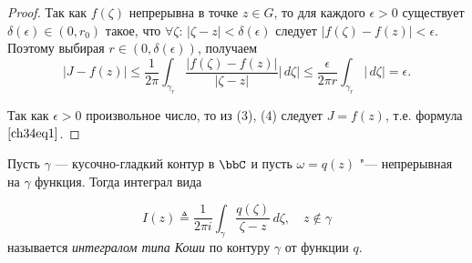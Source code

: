 \begin{proof}
Так как $f(\zeta)$ непрерывна в точке $z \in G$, то для каждого $\epsilon > 0$ существует $\delta(\epsilon) \in (0, r_0)$ такое, что $\forall \zeta$: $|\zeta - z| < \delta(\epsilon)$ следует $|f(\zeta) - f(z)| < \epsilon$. Поэтому выбирая $r \in (0, \delta(\epsilon))$, получаем
\begin{equation} \label{ch34eq4}
|J - f(z)| \le \frac{1}{2\pi} \int_{\gamma_r} \frac{|f(\zeta) - f(z)|}{|\zeta - z|}|\,d\zeta| \le 
\frac{\epsilon}{2 \pi r} \int_{\gamma_r} |\,d\zeta| = \epsilon.
\end{equation}

Так как $\epsilon > 0$ произвольное число, то из (3), (4) следует $J = f(z)$, т.е. формула $\eqref{ch34eq1}$.
\end{proof}

\begin{defn}\label{ch34defn1}
Пусть $\gamma$ — кусочно-гладкий контур в $\bbC$ и пусть $\omega = q(z)$ "--- непрерывная на $\gamma$ функция. Тогда интеграл вида

\begin{equation} \label{ch34eq5}
I(z) \triangleq \frac{1}{2 \pi i} \int_\gamma \frac{q(\zeta)}{\zeta - z}\,d\zeta, \quad z \notin \gamma
\end{equation}
называется \textit{интегралом типа Коши} по контуру $\gamma$ от функции $q$.
\end{defn}

